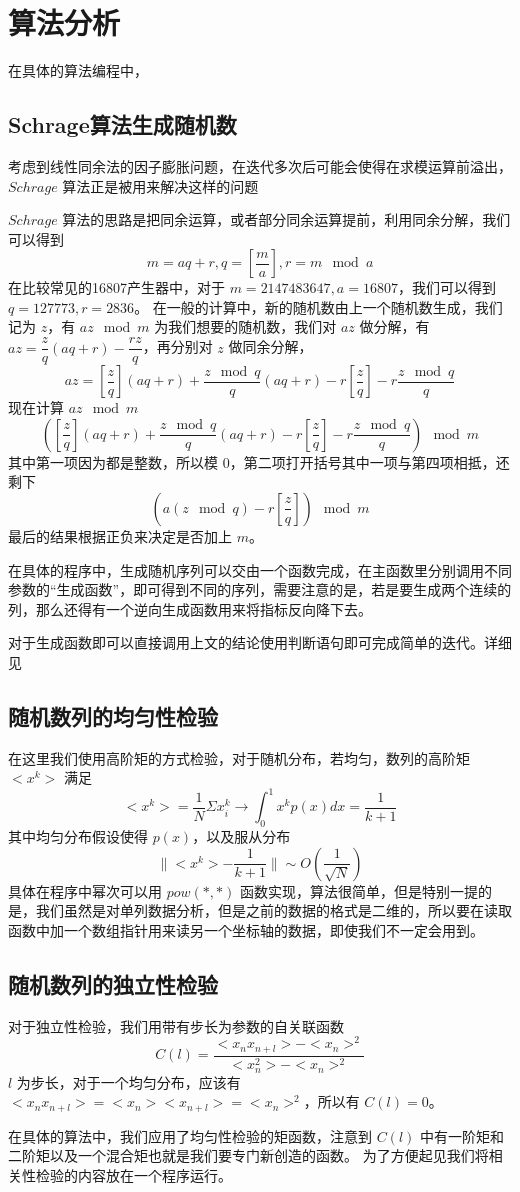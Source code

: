 \documentclass[11pt,a4paper,titlepage,openany]{book}
\begin{document}
\chapter{算法分析}
在具体的算法编程中，
\section{Schrage算法生成随机数}
考虑到线性同余法的因子膨胀问题，在迭代多次后可能会使得在求模运算前溢出，$Schrage$ 算法正是被用来解决这样的问题\par
$Schrage$ 算法的思路是把同余运算，或者部分同余运算提前，利用同余分解，我们可以得到
$$m=aq+r, q=[\frac{m}{a}], r= m\mod a$$
在比较常见的16807产生器中，对于 $m=2147483647, a=16807$，我们可以得到 $q=127773, r=2836$。
在一般的计算中，新的随机数由上一个随机数生成，我们记为 $z$，有 $az\mod m$ 为我们想要的随机数，我们对 $az$ 做分解，有 $az=\dfrac{z}{q}(aq+r)-\dfrac{rz}{q}$，再分别对 $z$ 做同余分解，$$az=[\frac{z}{q}](aq+r)+\frac{z\mod q}{q}(aq+r)-r[\frac{z}{q}]-r\frac{z\mod q}{q}$$
现在计算 $az\mod m$
$$([\frac{z}{q}](aq+r)+\frac{z\mod q}{q}(aq+r)-r[\frac{z}{q}]-r\frac{z\mod q}{q})\mod m$$
其中第一项因为都是整数，所以模 $0$，第二项打开括号其中一项与第四项相抵，还剩下$$(a(z\mod q)-r[\dfrac{z}{q}])\mod m$$
最后的结果根据正负来决定是否加上 $m$。\par
在具体的程序中，生成随机序列可以交由一个函数完成，在主函数里分别调用不同参数的“生成函数”，即可得到不同的序列，需要注意的是，若是要生成两个连续的列，那么还得有一个逆向生成函数用来将指标反向降下去。\par
对于生成函数即可以直接调用上文的结论使用判断语句即可完成简单的迭代。详细见
\section{随机数列的均匀性检验}
在这里我们使用高阶矩的方式检验，对于随机分布，若均匀，数列的高阶矩 $<x^{k}>$ 满足 $$<x^{k}>=\dfrac{1}{N}\Sigma x_{i}^{k} \rightarrow \int^{1}_{0} x^{k}p(x)dx=\dfrac{1}{k+1}$$
其中均匀分布假设使得 $p(x)$，以及服从分布
$$\|<x^{k}>-\dfrac{1}{k+1}\| \sim O(\dfrac{1}{\sqrt{N}})$$
具体在程序中幂次可以用 $pow(*,*)$ 函数实现，算法很简单，但是特别一提的是，我们虽然是对单列数据分析，但是之前的数据的格式是二维的，所以要在读取函数中加一个数组指针用来读另一个坐标轴的数据，即使我们不一定会用到。\par
\section{随机数列的独立性检验}
对于独立性检验，我们用带有步长为参数的自关联函数 $$C(l)=\dfrac{<x_{n}x_{n+l}>-<x_{n}>^{2}}{<x_{n}^{2}>-<x_{n}>^{2}}$$
$l$ 为步长，对于一个均匀分布，应该有 $<x_{n}x_{n+l}>=<x_{n}><x_{n+l}>=<x_{n}>^{2}$，所以有 $C(l)=0$。\par
在具体的算法中，我们应用了均匀性检验的矩函数，注意到 $C(l)$ 中有一阶矩和二阶矩以及一个混合矩也就是我们要专门新创造的函数。
为了方便起见我们将相关性检验的内容放在一个程序运行。
\end{document}
